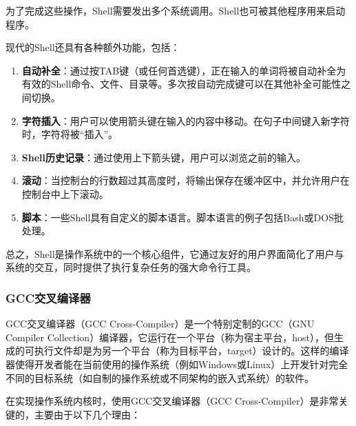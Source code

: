 为了完成这些操作，Shell需要发出多个系统调用。Shell也可被其他程序用来启动程序。

现代的Shell还具有各种额外功能，包括：

\begin{enumerate}
    \item \textbf{自动补全}：通过按TAB键（或任何首选键），正在输入的单词将被自动补全为有效的Shell命令、文件、目录等。多次按自动完成键可以在其他补全可能性之间切换。
    \item \textbf{字符插入}：用户可以使用箭头键在输入的内容中移动。在句子中间键入新字符时，字符将被“插入”。
    \item \textbf{Shell历史记录}：通过使用上下箭头键，用户可以浏览之前的输入。
    \item \textbf{滚动}：当控制台的行数超过其高度时，将输出保存在缓冲区中，并允许用户在控制台中上下滚动。
    \item \textbf{脚本}：一些Shell具有自定义的脚本语言。脚本语言的例子包括Bash或DOS批处理。
\end{enumerate}

总之，Shell是操作系统中的一个核心组件，它通过友好的用户界面简化了用户与系统的交互，同时提供了执行复杂任务的强大命令行工具。

\subsubsection{GCC交叉编译器}

GCC交叉编译器（GCC Cross-Compiler）是一个特别定制的GCC（GNU Compiler Collection）编译器，它运行在一个平台（称为宿主平台，host），但生成的可执行文件却是为另一个平台（称为目标平台，target）设计的。这样的编译器使得开发者能在当前使用的操作系统（例如Windows或Linux）上开发针对完全不同的目标系统（如自制的操作系统或不同架构的嵌入式系统）的软件。

在实现操作系统内核时，使用GCC交叉编译器（GCC Cross-Compiler）是非常关键的，主要由于以下几个理由：

